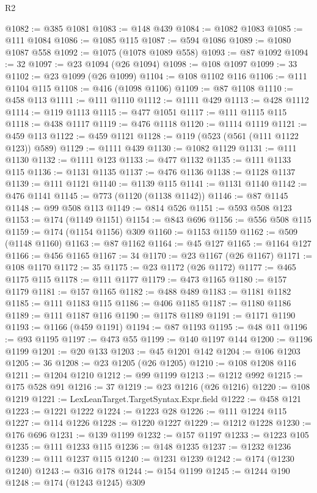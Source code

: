 \begin{lexlean}{R2}
\begin{coremodule}
@1082 := @385 @1081
@1083 := @148 @439
@1084 := @1082 @1083
@1085 := @111 @1084
@1086 := @1085 @115
@1087 := @594 @1086
@1089 := @1080 @1087 @558
@1092 := @1075 (@1078 @1089 @558)
@1093 := @87 @1092
@1094 := 32
@1097 := @23 @1094 (@26 @1094)
@1098 := @108 @1097
@1099 := 33
@1102 := @23 @1099 (@26 @1099)
@1104 := @108 @1102 @116
@1106 := @111 @1104 @115
@1108 := @416 (@1098 @1106)
@1109 := @87 @1108
@1110 := @458 @113
@1111 := @111 @1110
@1112 := @1111 @429
@1113 := @428 @1112
@1114 := @119 @1113
@1115 := @477 @1051
@1117 := @111 @1115 @115
@1118 := @438 @1117
@1119 := @476 @1118
@1120 := @1114 @1119
@1121 := @459 @113
@1122 := @459 @1121
@1128 := @119 (@523 (@561 (@111 @1122 @123)) @589)
@1129 := @1111 @439
@1130 := @1082 @1129
@1131 := @111 @1130
@1132 := @1111 @123
@1133 := @477 @1132
@1135 := @111 @1133 @115
@1136 := @1131 @1135
@1137 := @476 @1136
@1138 := @1128 @1137
@1139 := @111 @1121
@1140 := @1139 @115
@1141 := @1131 @1140
@1142 := @476 @1141
@1145 := @773 (@1120 (@1138 @1142))
@1146 := @87 @1145
@1148 := @99 @508 @113
@1149 := @814 @526
@1151 := @593 @508 @123
@1153 := @174 (@1149 @1151)
@1154 := @843 @696
@1156 := @556 @508 @115
@1159 := @174 (@1154 @1156) @309
@1160 := @1153 @1159
@1162 := @509 (@1148 @1160)
@1163 := @87 @1162
@1164 := @45 @127
@1165 := @1164 @127
@1166 := @456 @1165
@1167 := 34
@1170 := @23 @1167 (@26 @1167)
@1171 := @108 @1170
@1172 := 35
@1175 := @23 @1172 (@26 @1172)
@1177 := @465 @1175 @115
@1178 := @111 @1177
@1179 := @473 @1165
@1180 := @157 @1179
@1181 := @157 @1165
@1182 := @488 @489
@1183 := @1181 @1182
@1185 := @111 @1183 @115
@1186 := @406 @1185
@1187 := @1180 @1186
@1189 := @111 @1187 @116
@1190 := @1178 @1189
@1191 := @1171 @1190
@1193 := @1166 (@459 @1191)
@1194 := @87 @1193
@1195 := @48 @11
@1196 := @93 @1195
@1197 := @473 @55
@1199 := @140 @1197 @144
@1200 := @1196 @1199
@1201 := @20 @133
@1203 := @45 @1201 @142
@1204 := @106 @1203
@1205 := 36
@1208 := @23 @1205 (@26 @1205)
@1210 := @108 @1208 @116
@1211 := @1204 @1210
@1212 := @99 @1199
@1213 := @1212 @992
@1215 := @175 @528 @91
@1216 := 37
@1219 := @23 @1216 (@26 @1216)
@1220 := @108 @1219
@1221 := LexLeanTarget.TargetSyntax.Expr.field
@1222 := @458 @121
@1223 := @1221 @1222
@1224 := @1223 @28
@1226 := @111 @1224 @115
@1227 := @114 @1226
@1228 := @1220 @1227
@1229 := @1212 @1228
@1230 := @176 @696
@1231 := @139 @1199
@1232 := @157 @1197
@1233 := @1223 @105
@1235 := @111 @1233 @115
@1236 := @148 @1235
@1237 := @1232 @1236
@1239 := @111 @1237 @115
@1240 := @1231 @1239
@1242 := @174 (@1230 @1240)
@1243 := @316 @178
@1244 := @154 @1199
@1245 := @1244 @190
@1248 := @174 (@1243 @1245) @309

\end{coremodule}
\end{lexlean}
